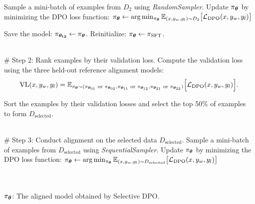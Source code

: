 \begin{algorithm}[!h]
\begin{algorithmic}
            \STATE Sample a mini-batch of examples from $D_2$ using \textit{RandomSampler}.
            \STATE Update $\mathbf{\pi_{\bm{\theta}}}$ by minimizing the DPO loss function:
            $\mathbf{\pi_{\bm{\theta}}} \leftarrow \arg\min_{\pi_{\bm{\theta}}} \mathbb{E}_{(x,y_w,y_l) \sim D_2} \big[\mathcal{L}_{\text{DPO}} (x,y_w,y_l)\big]$ \\ 
        \ENDWHILE
        
        \STATE Save the model: $\mathbf{\pi_{\bm{\theta}_{t2}}} \leftarrow \mathbf{\pi_{\bm{\theta}}}$.
        \STATE Reinitialize: $\mathbf{\pi_{\bm{\theta}}} \leftarrow  \mathbf{\pi_{\text{SFT}}}$. 
    \ENDFOR
    
    \ \\ 
    
    \# Step 2: Rank examples by their validation loss.
        \STATE Compute the validation loss using the three held-out reference alignment models:
        \[
        \text{VL} (x, y_w, y_l) = \mathbb{E}_{\pi_{\bm{\theta}} \sim (\pi_{\bm{\theta}_{01}} \text{ or } \pi_{\bm{\theta}_{02}}, \pi_{\bm{\theta}_{11}} \text{ or } \pi_{\bm{\theta}_{12}}, \pi_{\bm{\theta}_{21}} \text{ or } \pi_{\bm{\theta}_{22}})} 
        \Big[
        \mathcal{L}_{\text{DPO}}(x,y_w,y_l)
        \Big].
        \]
    \ENDFOR

    \STATE Sort the examples by their validation losses and select the top 50\% of examples to form $D_\text{selected}$.
    
    \ \\ 
    
    \# Step 3: Conduct alignment on the selected data $D_\text{selected}$.
        \STATE Sample a mini-batch of examples from $D_\text{selected}$ using \textit{SequentialSampler}.
        \STATE Update $\mathbf{\pi_{\bm{\theta}}}$ by minimizing the DPO loss function:
            $\mathbf{\pi_{\bm{\theta}}} \leftarrow \arg\min_{\pi_{\bm{\theta}}} \mathbb{E}_{(x,y_w,y_l) \sim D_{\text{selected}}} \big[\mathcal{L}_{\text{DPO}} (x,y_w,y_l)\big]$ \\ 
    \ENDWHILE

    \ \\ 
    
     \\
    $\mathbf{\pi_{\bm{\theta}}}$: The aligned model obtained by Selective DPO.
    
\end{algorithmic}
\end{algorithm}


